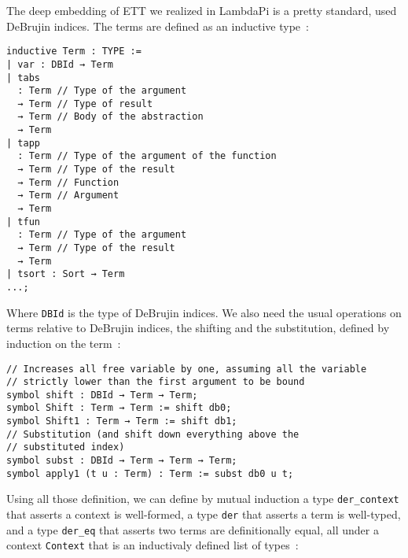 The deep embedding of ETT we realized in LambdaPi is a pretty standard, used
DeBrujin indices. The terms are defined as an inductive type~:

\begin{lstlisting}
inductive Term : TYPE :=
| var : DBId → Term
| tabs
  : Term // Type of the argument
  → Term // Type of result
  → Term // Body of the abstraction
  → Term
| tapp
  : Term // Type of the argument of the function
  → Term // Type of the result
  → Term // Function
  → Term // Argument
  → Term
| tfun
  : Term // Type of the argument
  → Term // Type of the result
  → Term
| tsort : Sort → Term
...;
\end{lstlisting}

Where \texttt{DBId} is the type of DeBrujin indices. We also need the usual
operations on terms relative to DeBrujin indices, the shifting and the
substitution, defined by induction on the term~:

\begin{lstlisting}
// Increases all free variable by one, assuming all the variable
// strictly lower than the first argument to be bound
symbol shift : DBId → Term → Term;
symbol Shift : Term → Term := shift db0;
symbol Shift1 : Term → Term := shift db1;
// Substitution (and shift down everything above the
// substituted index)
symbol subst : DBId → Term → Term → Term;
symbol apply1 (t u : Term) : Term := subst db0 u t;
\end{lstlisting}

Using all those definition, we can define by mutual induction a type
\texttt{der\_context} that asserts a context is well-formed, a type
\texttt{der} that asserts a term is well-typed, and a type \texttt{der\_eq}
that asserts two terms are definitionally equal, all under a context
\texttt{Context} that is an inductivaly defined list of types~:

